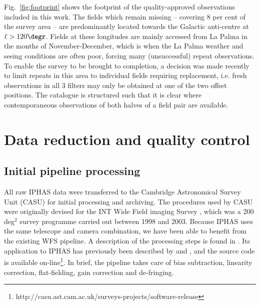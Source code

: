 \documentclass[a4paper,useAMS,usenatbib]{mn2e}
\begin{document}
Fig.~\ref{fig:footprint} shows the footprint
of the quality-approved observations included in this work. 
The fields which remain missing 
-- covering 8 per cent of the survey area --
are predominantly located towards the Galactic anti-centre 
at $\ell > 120\degr$.
Fields at these longitudes are mainly accessed from La Palma 
in the months of November-December,
which is when the La Palma weather and seeing conditions are often poor,
forcing many (unsuccessful) repeat observations.
To enable the survey to be brought to completion, 
a decision was made recently to limit repeats in this area 
to individual fields requiring replacement,
i.e. fresh observations in all 3 filters may only be obtained 
at one of the two offset positions.  
The catalogue is structured such that it is clear 
where contemporaneous observations of both halves of a field pair
are available.


\section{Data reduction and quality control}
\label{sec:reduction}

\subsection{Initial pipeline processing}

All raw IPHAS data were transferred
to the Cambridge Astronomical Survey Unit (CASU) 
for initial processing and archiving.
The procedures used by CASU were originally devised
for the INT Wide Field imaging Survey \citep[WFS;][]{McMahon2001,Irwin2005},
which was a 200 deg$^2$ survey programme carried out 
between 1998 and 2003.
Because IPHAS uses the same telescope and camera combination,
we have been able to benefit from the existing WFS pipeline.
A description of the processing steps 
is found in \citet{Irwin2001}.
Its application to IPHAS has previously been described
by \citet{Drew2005} and \citet{Gonzalez-Solares2008},
and the source code is available
on-line\footnote{http://casu.ast.cam.ac.uk/surveys-projects/software-release}. 
In brief, the pipeline takes care of bias subtraction,
linearity correction, flat-fielding,
gain correction and de-fringing.

\end{document}
